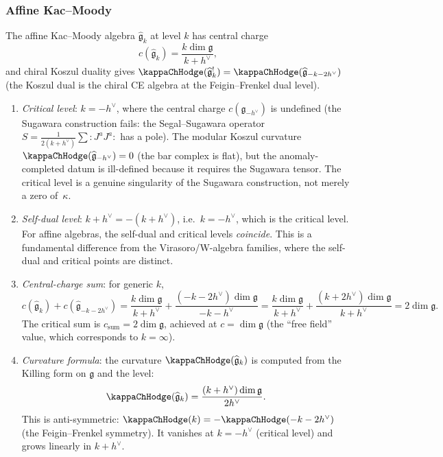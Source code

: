 \subsubsection{Affine Kac--Moody}

\begin{computation}
The affine Kac--Moody algebra $\widehat{\mathfrak{g}}_k$
at level $k$ has central charge
\[
c(\widehat{\mathfrak{g}}_k)
= \frac{k \dim\mathfrak{g}}{k + h^\vee},
\]
and chiral Koszul duality gives
$\kappaChHodge(\widehat{\mathfrak{g}}_k^!)
= \kappaChHodge(\widehat{\mathfrak{g}}_{-k-2h^\vee})$
(the Koszul dual is the chiral CE algebra at the Feigin--Frenkel dual level).

\begin{enumerate}[label=\textup{(\roman*)}]
\item \emph{Critical level}: $k = -h^\vee$, where the central
 charge $c(\widehat{\mathfrak{g}}_{-h^\vee})$ is undefined
 (the Sugawara construction fails: the Segal--Sugawara operator
 $S = \frac{1}{2(k+h^\vee)}\sum {:}J^a J^a{:}$ has a pole).
 The modular Koszul curvature
 $\kappaChHodge(\widehat{\mathfrak{g}}_{-h^\vee})
 = 0$ (the bar complex is flat), but the anomaly-completed
 datum is ill-defined because it requires the Sugawara tensor.
 The critical level is a genuine singularity of the
 Sugawara construction, not merely a zero of~$\kappa$.

\item \emph{Self-dual level}: $k + h^\vee = -(k + h^\vee)$,
 i.e.\ $k = -h^\vee$, which is the critical level.
 For affine algebras, the self-dual and critical levels
 \emph{coincide}.
 This is a fundamental difference from the Virasoro/W-algebra
 families, where the self-dual and critical points are distinct.

\item \emph{Central-charge sum}: for generic $k$,
 \[
 c(\widehat{\mathfrak{g}}_k) + c(\widehat{\mathfrak{g}}_{-k-2h^\vee})
 = \frac{k\dim\mathfrak{g}}{k+h^\vee}
 + \frac{(-k-2h^\vee)\dim\mathfrak{g}}{-k-h^\vee}
 = \frac{k\dim\mathfrak{g}}{k+h^\vee}
 + \frac{(k+2h^\vee)\dim\mathfrak{g}}{k+h^\vee}
 = 2\dim\mathfrak{g}.
 \]
 The critical sum is $c_{\mathrm{sum}} = 2\dim\mathfrak{g}$,
 achieved at $c = \dim\mathfrak{g}$ (the ``free field''
 value, which corresponds to $k = \infty$).

\item \emph{Curvature formula}: the curvature
 $\kappaChHodge(\widehat{\mathfrak{g}}_k)$ is computed from the
 Killing form on $\mathfrak{g}$ and the level:
 \[
 \kappaChHodge(\widehat{\mathfrak{g}}_k)
 = \frac{(k + h^\vee)\dim\mathfrak{g}}{2h^\vee}.
 \]
 This is anti-symmetric: $\kappaChHodge(k) = -\kappaChHodge(-k-2h^\vee)$
 (the Feigin--Frenkel symmetry).
 It vanishes at $k = -h^\vee$ (critical level) and grows
 linearly in $k + h^\vee$.
\end{enumerate}
\end{computation}


